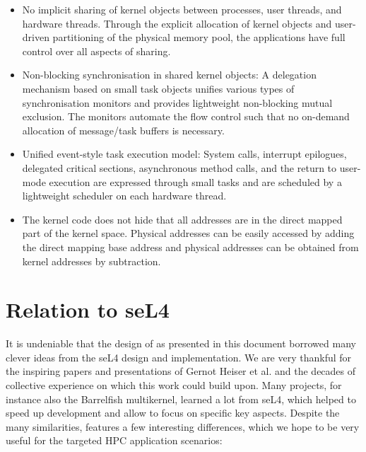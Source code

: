\begin{itemize}
\item No implicit sharing of kernel objects between processes, user threads, and hardware threads. Through the explicit allocation of kernel objects and user-driven partitioning of the physical memory pool, the applications have full control over all aspects of sharing.  
\item Non-blocking synchronisation in shared kernel objects: A delegation mechanism based on small task objects unifies various types of synchronisation monitors and provides lightweight non-blocking mutual exclusion. The monitors automate the flow control such that no on-demand allocation of message/task buffers is necessary.
\item Unified event-style task execution model: System calls, interrupt epilogues, delegated critical sections, asynchronous method calls, and the return to user-mode execution are expressed through small tasks and are scheduled by a lightweight scheduler on each hardware thread.
\item The kernel code does not hide that all addresses are in the direct mapped part of the kernel space. Physical addresses can be easily accessed by adding the direct mapping base address and physical addresses can be obtained from kernel addresses by subtraction.
\end{itemize}

\section{Relation to seL4}

It is undeniable that the design of \mythos as presented in this document borrowed many clever ideas from the seL4 design and implementation. We are very thankful for the inspiring papers and presentations of Gernot Heiser et al. and the decades of collective experience on which this work could build upon. Many projects, for instance also the Barrelfish multikernel, learned a lot from seL4, which helped to speed up development and allow to focus on specific key aspects. Despite the many similarities, \mythos features a few interesting differences, which we hope to be very useful for the targeted HPC application scenarios:  

